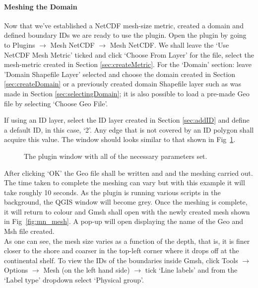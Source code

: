\paragraph{Meshing the Domain\\}
\label{sec:meshDomain}
Now that we've established a NetCDF mesh-size metric, created a domain and defined boundary IDs we are ready to use the plugin. Open the plugin by going to Plugins $\rightarrow$ Mesh NetCDF $\rightarrow$ Mesh NetCDF. We shall leave the `Use NetCDF Mesh Metric' ticked and click `Choose From Layer' for the file, select the mesh-metric created in Section \ref{sec:createMetric}. For the `Domain' section: leave 'Domain Shapefile Layer' selected and choose the domain created in Section \ref{sec:createDomain} or a previously created domain Shapefile layer such as was made in Section \ref{sec:selectingDomain}; it is also possible to load a pre-made Geo file by selecting `Choose Geo File'. 

If using an ID layer, select the ID layer created in Section \ref{sec:addID} and define a default ID, in this case, `2'. Any edge that is not covered by an ID polygon shall acquire this value. The window should looks similar to that shown in Fig~\ref{fig:mn_preMesh}.

\begin{figure}[h!]
  \centering
  \caption{The plugin window with all of the necessary parameters set.}
  \label{fig:mn_preMesh}
\end{figure}

After clicking `OK' the Geo file shall be written and and the meshing carried out. The time taken to complete the meshing can vary but with this example it will take roughly 10 seconds. As the plugin is running various scripts in the background, the QGIS window will become grey. Once the meshing is complete, it will return to colour and Gmsh shall open with the newly created mesh shown in Fig~\ref{fig:mn_mesh}. A pop-up will open displaying the name of the Geo and Msh file created. \\

As one can see, the mesh size varies as a function of the depth, that is, it is finer closer to the shore and coarser in the top-left corner where it drops off at the continental shelf. To view the IDs of the boundaries inside Gmsh, click Tools $\rightarrow$ Options $\rightarrow$ Mesh (on the left hand side) $\rightarrow$ tick `Line labels' and from the `Label type' dropdown select `Physical group'.


